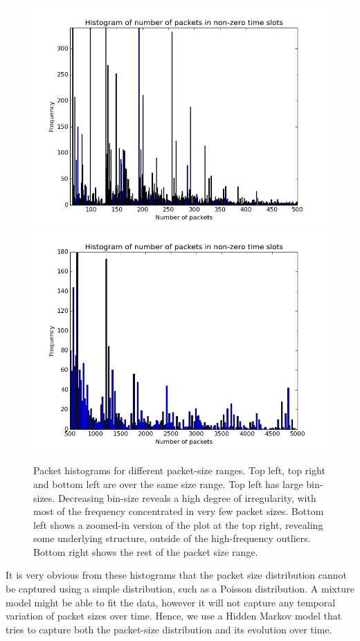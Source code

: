 \documentclass[11pt, twoside]{article}
\begin{document}
\begin{figure}[h!]
	\includegraphics[scale = 0.35]{packet-hist-fine-zoom}
	\includegraphics[scale = 0.35]{packet-hist-500-5000}
	\caption{Packet histograms for different packet-size ranges. Top left, top right and bottom left are over the same size range. Top left has large bin-sizes. Decreasing bin-size reveals a high degree of irregularity, with most of the frequency concentrated in very few packet sizes. Bottom left shows a zoomed-in version of the plot at the top right, revealing some underlying structure, outside of the high-frequency outliers. Bottom right shows the rest of the packet size range.}
	\label{fig:packet-histograms}
\end{figure}

It is very obvious from these histograms that the packet size distribution cannot be captured using a simple distribution, such as a Poisson distribution. A mixture model might be able to fit the data, however it will not capture any temporal variation of packet sizes over time. Hence, we use a Hidden Markov model that tries to capture both the packet-size distribution and its evolution over time.
\end{document}
